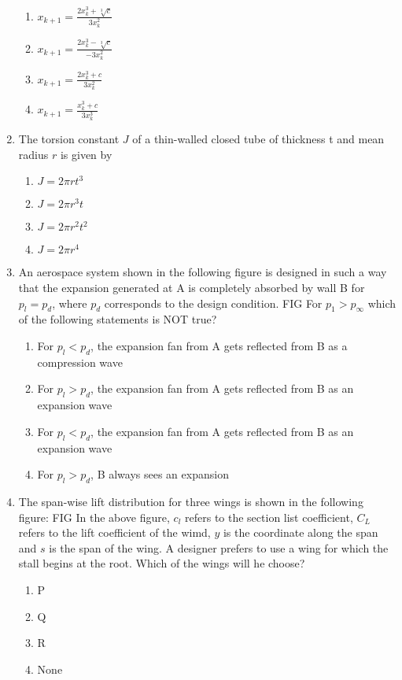 \documentclass[journal]{IEEEtran}
\begin{document}
\begin{enumerate}
\begin{enumerate}
			\item $x_{k+1} = \frac{2x_k^3+\sqrt[3]{c}}{3x_k^2}$
			\item $x_{k+1} = \frac{2x_k^3-\sqrt[3]{c}}{-3x_k^2}$
			\item $x_{k+1} = \frac{2x_k^3+{c}}{3x_k^2}$
			\item $x_{k+1} = \frac{x_k^3+{c}}{3x_k^3}$
		\end{enumerate}
	\item The torsion constant $J$ of a thin-walled closed tube of thickness t and mean radius $r$ is given by
		\begin{enumerate}
			\item $J=2\pi rt^3$
			\item $J=2\pi r^3t$
			\item $J=2\pi r^2t^2$
			\item $J=2\pi r^4$
		\end{enumerate}
	\item An aerospace system shown in the following figure is designed in such a way that the expansion generated at A is completely absorbed by wall B for $p_l=p_d$, where $p_d$ corresponds to the design condition.
		FIG
		For $p_1>p_{\infty}$ which of the following statements is NOT true?
		\begin{enumerate}
			\item For $p_l<p_d$, the expansion fan from A gets reflected from B as a compression wave
			\item For $p_l>p_d$, the expansion fan from A gets reflected from B as an expansion wave
			\item For $p_l<p_d$, the expansion fan from A gets reflected from B as an expansion wave
			\item For $p_l>p_d$, B always sees an expansion
		\end{enumerate}
	\item The span-wise lift distribution for three wings is shown in the following figure:
		FIG
		In the above figure, $c_l$ refers to the section list coefficient, $C_L$ refers to the lift coefficient of the wimd, $y$ is the coordinate along the span and $s$ is the span of the wing. A designer prefers to use a wing for which the stall begins at the root. Which of the wings will he choose?
		\begin{enumerate}
			\item P
			\item Q
			\item R
			\item None
		\end{enumerate}
\end{enumerate}
\end{document}
